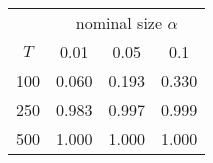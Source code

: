 % 
\begin{tabular}{cccc}
  \hline
  & \multicolumn{3}{c}{nominal size $\alpha$} \\
 $T$ & 0.01 & 0.05 & 0.1 \\
 \hline
100 & 0.060 & 0.193 & 0.330 \\ 
  250 & 0.983 & 0.997 & 0.999 \\ 
  500 & 1.000 & 1.000 & 1.000 \\ 
   \hline
\end{tabular}
